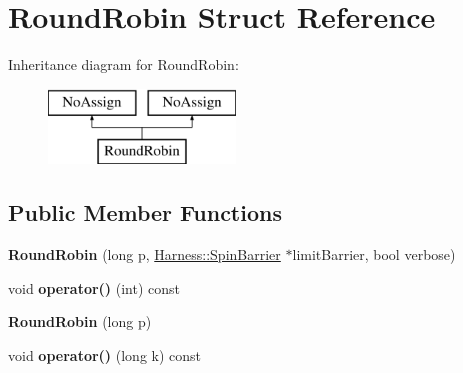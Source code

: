 \hypertarget{structRoundRobin}{}\section{Round\+Robin Struct Reference}
\label{structRoundRobin}
Inheritance diagram for Round\+Robin\+:\begin{figure}[H]
\begin{center}
\leavevmode
\includegraphics[height=2.000000cm]{structRoundRobin}
\end{center}
\end{figure}
\subsection*{Public Member Functions}
\begin{DoxyCompactItemize}
\item 
\hypertarget{structRoundRobin_a661c04482f7b9cac2e3f3c35beeb571a}{}{\bfseries Round\+Robin} (long p, \hyperlink{classHarness_1_1SpinBarrier}{Harness\+::\+Spin\+Barrier} $\ast$limit\+Barrier, bool verbose)\label{structRoundRobin_a661c04482f7b9cac2e3f3c35beeb571a}

\item 
\hypertarget{structRoundRobin_a0d83c68feb87c0bd3f02a495621de85e}{}void {\bfseries operator()} (int) const \label{structRoundRobin_a0d83c68feb87c0bd3f02a495621de85e}

\item 
\hypertarget{structRoundRobin_a6b7825f122f79c2717be8e7d2c3339b8}{}{\bfseries Round\+Robin} (long p)\label{structRoundRobin_a6b7825f122f79c2717be8e7d2c3339b8}

\item 
\hypertarget{structRoundRobin_aba5976fa6bd47ab8bcf6bb742eddb908}{}void {\bfseries operator()} (long k) const \label{structRoundRobin_aba5976fa6bd47ab8bcf6bb742eddb908}

\end{DoxyCompactItemize}
